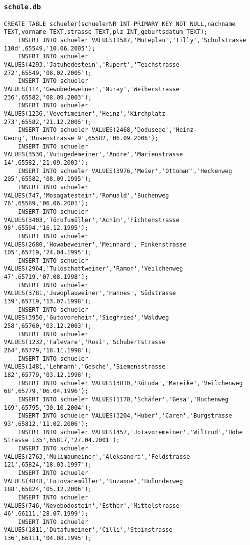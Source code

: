 \subsubsection{\lstinline!schule.db!}
\begin{lstlisting}[breaklines=True, numbers=none, basicstyle=\tiny, keepspaces=false]
	CREATE TABLE schueler(schuelerNR INT PRIMARY KEY NOT NULL,nachname TEXT,vorname TEXT,strasse TEXT,plz INT,geburtsdatum TEXT);
	INSERT INTO schueler VALUES(1587,'Muteplau','Tilly','Schulstrasse 110d',65549,'10.06.2005');
	INSERT INTO schueler VALUES(4293,'Jatuhedestein','Rupert','Teichstrasse 272',65549,'08.02.2005');
	INSERT INTO schueler VALUES(114,'Gewubedeweiner','Nuray','Weiherstrasse 236',65582,'08.09.2003');
	INSERT INTO schueler VALUES(1236,'Vevefimeiner','Heinz','Kirchplatz 273',65582,'21.12.2005');
	INSERT INTO schueler VALUES(2468,'Dodusede','Heinz-Georg','Rosenstrasse 9',65582,'06.09.2006');
	INSERT INTO schueler VALUES(3530,'Vutugedemeiner','Andre','Marienstrasse 14',65582,'21.09.2003');
	INSERT INTO schueler VALUES(3976,'Meier','Ottomar','Heckenweg 205',65582,'08.09.1995');
	INSERT INTO schueler VALUES(747,'Mosagatestein','Romuald','Buchenweg 76',65589,'06.06.2001');
	INSERT INTO schueler VALUES(3403,'Törofumüller','Achim','Fichtenstrasse 98',65594,'16.12.1995');
	INSERT INTO schueler VALUES(2680,'Howabeweiner','Meinhard','Finkenstrasse 105',65719,'24.04.1995');
	INSERT INTO schueler VALUES(2964,'Tuloschattweiner','Ramon','Veilchenweg 47',65719,'07.08.1998');
	INSERT INTO schueler VALUES(3781,'Juwoplauweiner','Hannes','Südstrasse 139',65719,'13.07.1998');
	INSERT INTO schueler VALUES(3956,'Gutovorehein','Siegfried','Waldweg 258',65760,'03.12.2003');
	INSERT INTO schueler VALUES(1232,'Falevare','Rosi','Schubertstrasse 264',65779,'18.11.1998');
	INSERT INTO schueler VALUES(1481,'Lehmann','Gesche','Siemensstrasse 182',65779,'03.12.1998');
	INSERT INTO schueler VALUES(3810,'Rötoda','Mareike','Veilchenweg 68',65779,'06.04.1996');
	INSERT INTO schueler VALUES(1170,'Schäfer','Gesa','Buchenweg 169',65795,'30.10.2004');
	INSERT INTO schueler VALUES(3204,'Huber','Caren','Burgstrasse 93',65812,'11.02.2006');
	INSERT INTO schueler VALUES(457,'Jotavoremeiner','Wiltrud','Hohe Strasse 135',65817,'27.04.2001');
	INSERT INTO schueler VALUES(2763,'Mülimaumeiner','Aleksandra','Feldstrasse 121',65824,'18.03.1997');
	INSERT INTO schueler VALUES(4848,'Fotovaremüller','Suzanne','Holunderweg 188',65824,'05.12.2006');
	INSERT INTO schueler VALUES(746,'Nevebodostein','Esther','Mittelstrasse 46',66111,'28.07.1999');
	INSERT INTO schueler VALUES(1811,'Dutafumeiner','Cilli','Steinstrasse 136',66111,'04.08.1995');

\end{lstlisting}
